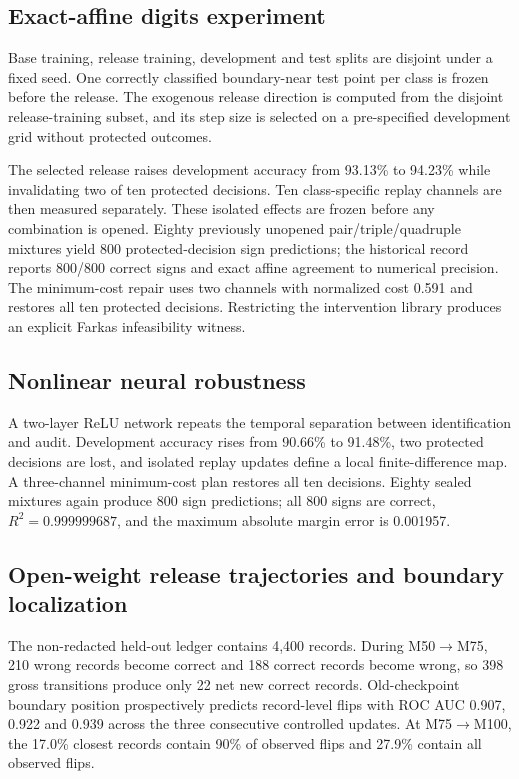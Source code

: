 \documentclass[11pt,letterpaper]{article}
\theoremstyle{plain}
\newcommand{\1}{\mathbf 1}
\begin{document}
\subsection{Exact-affine digits experiment}
Base training, release training, development and test splits are disjoint under a fixed seed. One correctly classified boundary-near test point per class is frozen before the release. The exogenous release direction is computed from the disjoint release-training subset, and its step size is selected on a pre-specified development grid without protected outcomes.

The selected release raises development accuracy from 93.13\% to 94.23\% while invalidating two of ten protected decisions. Ten class-specific replay channels are then measured separately. These isolated effects are frozen before any combination is opened. Eighty previously unopened pair/triple/quadruple mixtures yield 800 protected-decision sign predictions; the historical record reports 800/800 correct signs and exact affine agreement to numerical precision. The minimum-cost repair uses two channels with normalized cost 0.591 and restores all ten protected decisions. Restricting the intervention library produces an explicit Farkas infeasibility witness.

\subsection{Nonlinear neural robustness}
A two-layer ReLU network repeats the temporal separation between identification and audit. Development accuracy rises from 90.66\% to 91.48\%, two protected decisions are lost, and isolated replay updates define a local finite-difference map. A three-channel minimum-cost plan restores all ten decisions. Eighty sealed mixtures again produce 800 sign predictions; all 800 signs are correct, $R^2=0.999999687$, and the maximum absolute margin error is 0.001957.

\subsection{Open-weight release trajectories and boundary localization}
The non-redacted held-out ledger contains 4,400 records. During M50$\to$M75, 210 wrong records become correct and 188 correct records become wrong, so 398 gross transitions produce only 22 net new correct records. Old-checkpoint boundary position prospectively predicts record-level flips with ROC AUC 0.907, 0.922 and 0.939 across the three consecutive controlled updates. At M75$\to$M100, the 17.0\% closest records contain 90\% of observed flips and 27.9\% contain all observed flips.
\end{document}
